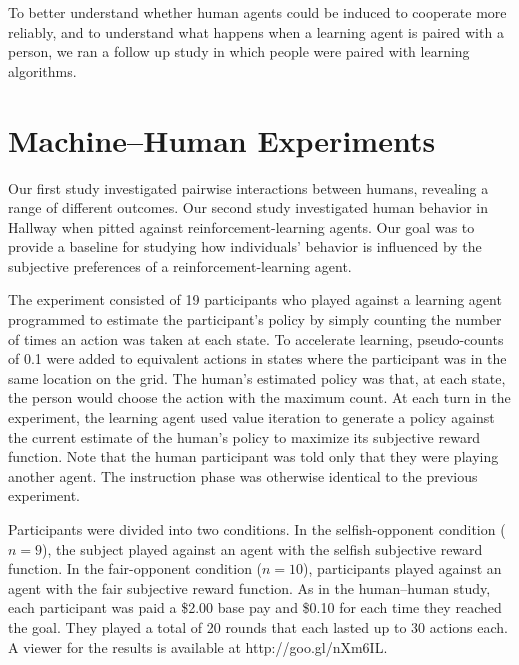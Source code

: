 \documentclass[letterpaper]{article}
\begin{document}
To better understand whether human agents could be induced to
cooperate more reliably, and to understand what happens when a
learning agent is paired with a person, we ran a follow up study in
which people were paired with learning algorithms.


\section{Machine--Human Experiments}

Our first study investigated pairwise interactions between humans,
revealing a range of different outcomes. Our second study investigated
human behavior in Hallway when pitted against reinforcement-learning
agents. Our goal was to provide a baseline for studying how individuals'
behavior is influenced by the subjective preferences of a
reinforcement-learning agent.

The experiment consisted of 19 participants who played against a
learning agent programmed to estimate the participant's policy by
simply counting the number of times an action was taken at each
state. To accelerate learning, pseudo-counts of 0.1 were added to
equivalent actions in states where the participant was in the same
location on the grid. The human's estimated policy was that, at each
state, the person would choose the action with the maximum count. At
each turn in the experiment, the learning agent used value iteration
to generate a policy against the current estimate of the human's
policy to maximize its subjective reward function. Note that the human
participant was told only that they were playing another agent. The instruction phase was otherwise identical to the previous experiment.

Participants were divided into two conditions. In the selfish-opponent
condition ($n=9$), the subject played against an agent with the
selfish subjective reward function. In the fair-opponent condition
($n=10$), participants played against an agent with the fair
subjective reward function. As in the human--human study, each
participant was paid a \$2.00 base pay and \$0.10 for each time they
reached the goal. They played a total of 20 rounds that each lasted up
to 30 actions each. A viewer for the results is available at
http://goo.gl/nXm6IL.
\end{document}
